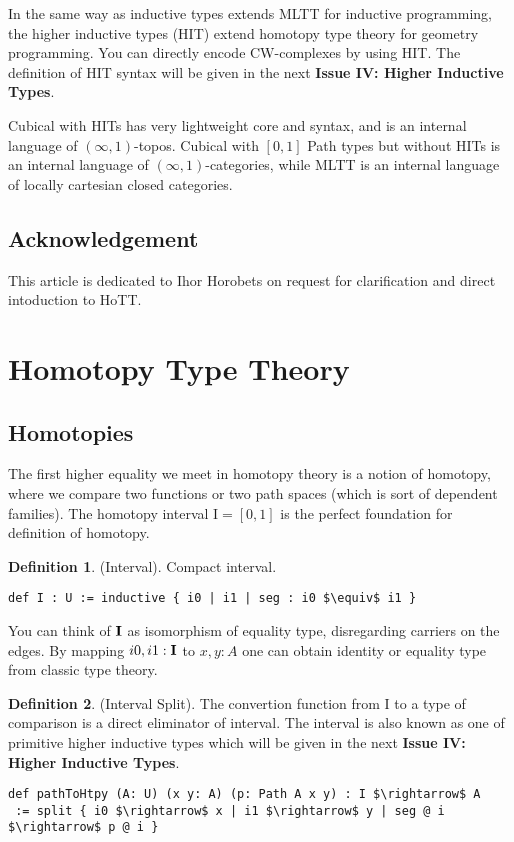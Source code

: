 \documentclass{article}
\theoremstyle{definition}
\newtheorem{definition}{Definition}
\begin{document}
In the same way as inductive types extends MLTT for inductive programming,
the higher inductive types (HIT) extend homotopy type theory for geometry programming.
You can directly encode CW-complexes by using HIT. The definition of HIT syntax will
be given in the next {\bf Issue IV: Higher Inductive Types}.

Cubical with HITs has very lightweight core and syntax, and
is an internal language of $(\infty,1)$-topos.
Cubical with $[0,1]$ Path types but without HITs is an
internal language of $(\infty,1)$-categories, while MLTT
is an internal language of locally cartesian closed categories.

\subsection{Acknowledgement}
This article is dedicated to Ihor Horobets on request for clarification and direct intoduction to HoTT.

\newpage
\section{Homotopy Type Theory}
\subsection{Homotopies}
The first higher equality we meet in homotopy theory is a notion of homotopy,
where we compare two functions or two path spaces (which is sort of dependent families).
The homotopy interval $\mathrm{I}=[0,1]$ is the perfect foundation for definition of homotopy.

\begin{definition} (Interval). Compact interval.
\begin{lstlisting}[mathescape=true]
def I : U := inductive { i0 | i1 | seg : i0 $\equiv$ i1 }
\end{lstlisting}
\end{definition}

You can think of ${\bf I}$ as isomorphism of equality type,
disregarding carriers on the edges. By mapping $i0,i1:{\bf I}$ to $x,y:A$ one can
obtain identity or equality type from classic type theory.

\begin{definition} (Interval Split).
The convertion function from $\mathrm{I}$ to a type of comparison
is a direct eliminator of interval. The interval is also known as one of
primitive higher inductive types which will be given in the next
{\bf Issue IV: Higher Inductive Types}.
\begin{lstlisting}[mathescape=true]
def pathToHtpy (A: U) (x y: A) (p: Path A x y) : I $\rightarrow$ A
 := split { i0 $\rightarrow$ x | i1 $\rightarrow$ y | seg @ i $\rightarrow$ p @ i }
\end{lstlisting}
\end{definition}
\end{document}
